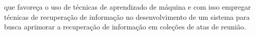que favoreça o uso de técnicas de aprendizado de máquina e com isso empregar técnicas de recuperação de informação no desenvolvimento de um sistema para busca aprimorar a recuperação de informação em coleções de atas de reunião. 

















